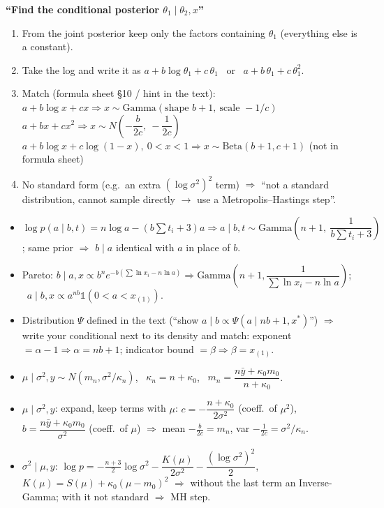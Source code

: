 \documentclass[10pt]{article}
\newcommand{\Q}[1]{\textbf{``#1''}}
\newcommand{\one}{\mathbb{1}}
\newenvironment{answer}[1][Answer to write]{\par\vspace{2pt}\begin{shaded}\small\textbf{#1}\par\vspace{1pt}}{\end{shaded}\vspace{-2pt}}
\begin{document}
\begin{answer}[\Q{Find the conditional posterior $\theta_1\mid\theta_2,x$}]
\begin{enumerate}
\item From the joint posterior keep only the factors containing $\theta_1$ (everything else is a constant).
\item Take the log and write it as $a+b\log\theta_1+c\,\theta_1$ \ or \ $a+b\,\theta_1+c\,\theta_1^2$.
\item Match (formula sheet \S10 / hint in the text):\\
$a+b\log x+cx \Rightarrow x\sim\text{Gamma}(\text{shape } b+1,\ \text{scale } -1/c)$ \qquad $a+bx+cx^2\Rightarrow x\sim N\!\left(-\dfrac{b}{2c},\ -\dfrac1{2c}\right)$\\
$a+b\log x+c\log(1-x),\ 0<x<1\Rightarrow x\sim\text{Beta}(b+1,c+1)$ (not in formula sheet)
\item No standard form (e.g.\ an extra $(\log\sigma^2)^2$ term) $\Rightarrow$ ``not a standard distribution, cannot sample directly $\to$ use a Metropolis--Hastings step''.
\end{enumerate}
\end{answer}
\begin{itemize}
\item $\log p(a\mid b,t)=n\log a-(b\sum t_i+3)a \Rightarrow a\mid b,t\sim\text{Gamma}\!\left(n+1,\ \dfrac1{b\sum t_i+3}\right)$; same prior $\Rightarrow$ $b\mid a$ identical with $a$ in place of $b$.
\item Pareto: $b\mid a,x\propto b^ne^{-b(\sum\ln x_i-n\ln a)}\Rightarrow\text{Gamma}\!\left(n+1,\dfrac1{\sum\ln x_i-n\ln a}\right)$; \ $a\mid b,x\propto a^{nb}\one(0<a<x_{(1)})$.
\item Distribution $\Psi$ defined in the text (``show $a\mid b\propto\Psi(a\mid nb+1,x^*)$'') $\Rightarrow$ write your conditional next to its density and match: exponent $=\alpha-1\Rightarrow\alpha=nb+1$; indicator bound $=\beta\Rightarrow\beta=x_{(1)}$.
\item $\mu\mid\sigma^2,y\sim N(m_n,\sigma^2/\kappa_n)$, \ $\kappa_n=n+\kappa_0$, \ $m_n=\dfrac{n\bar y+\kappa_0m_0}{n+\kappa_0}$.
\item $\mu\mid\sigma^2,y$: expand, keep terms with $\mu$: $c=-\dfrac{n+\kappa_0}{2\sigma^2}$ (coeff.\ of $\mu^2$), $b=\dfrac{n\bar y+\kappa_0m_0}{\sigma^2}$ (coeff.\ of $\mu$) $\Rightarrow$ mean $-\tfrac b{2c}=m_n$, var $-\tfrac1{2c}=\sigma^2/\kappa_n$.
\item $\sigma^2\mid\mu,y$: $\log p=-\tfrac{n+3}2\log\sigma^2-\dfrac{K(\mu)}{2\sigma^2}-\dfrac{(\log\sigma^2)^2}2$, $K(\mu)=S(\mu)+\kappa_0(\mu-m_0)^2$ $\Rightarrow$ without the last term an Inverse-Gamma; with it not standard $\Rightarrow$ MH step.
\end{itemize}
\end{document}
